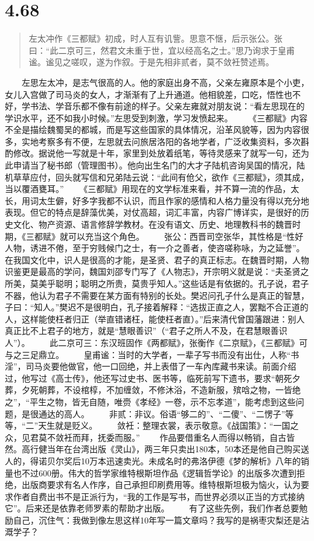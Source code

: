 \documentclass[]{book}
\begin{document}
\section{4.68}\label{section-245}

\begin{quote}
左太冲作《三都赋》初成，时人互有讥訾。思意不惬，后示张公。张曰：``此二京可三，然君文未重于世，宜以经高名之士。''思乃询求于皇甫谧。谧见之嗟叹，遂为作叙。于是先相非贰者，莫不敛衽赞述焉。
\end{quote}

　　左思左太冲，是志气很高的人。他的家庭出身不高，父亲左雍原本是个小吏，女儿入宫做了司马炎的女人，才渐渐有了上升通道。他相貌差，口吃，悟性也不好，学书法、学音乐都不像有前途的样子。父亲左雍就对朋友说：``看左思现在的学识水平，还不如我小时候。''左思受到刺激，学习发愤起来。
　　《三都赋》内容不全是描绘魏蜀吴的都城，而是写这些国家的具体情况，沿革风貌等，因为内容很多，实地考察多有不便，左思就去问旅居洛阳的各地学者，广泛收集资料，多次斟酌修改。据说他一写就是十年，家里到处放着纸笔，等待灵感来了就写一句，还为此申请当了秘书郎（管理图书）。他向出生名门的大才子陆机咨询吴国的情况，陆机草草应付，回头就写信和兄弟陆云说：``此间有伧父，欲作《三都赋》，须其成，当以覆酒甕耳。''
　　《三都赋》用现在的文学标准来看，并不算一流的作品，太长，用词太生僻，好多字我都不认识，而且作家的感情和人格力量没有得以充分地表现。但它的特点是辞藻优美，对仗高超，词汇丰富，内容广博详实，是很好的历史文化、物产资源、语言修辞学教材。在没有语文、历史、地理教科书的魏晋时期，《三都赋》就可以充当这个角色。
　　张公：西晋司空张华，其性格是``性好人物，诱进不倦，至于穷贱候门之士，有一介之善者，使咨嗟称咏，为之延誉''。在我国文化中，识人是很高的才能，是圣贤、君子的真正标志。在魏晋时期，人物识鉴更是最高的学问，魏国刘邵专门写了《人物志》，开宗明义就是说：``夫圣贤之所美，莫美乎聪明；聪明之所贵，莫贵乎知人。''这些话是有依据的。孔子说，君子不器，他认为君子不需要在某方面有特别的长处。樊迟问孔子什么是真正的智慧，子曰：``知人。''樊迟不是很明白，孔子接着解释：``选拔正直之人，罢黜不合正道的人，这样能使枉者归正（举直错诸枉，能使枉者直）。''后来清代曾国藩跟进：别人真正比不上君子的地方，就是``慧眼善识''（``君子之所人不及，在君慧眼善识人''）。
　　此二京可三：东汉班固作《两都赋》，张衡作《二京赋》，《三都赋》可与之三足鼎立。
　　皇甫谧：当时的大学者，一辈子写书而没有出仕，人称``书淫''，司马炎要他做官，他一口回绝，并上表借了一车內库藏书来读。前面介绍过，他写过《高士传》，他还写过史书、医书等，临死前写下遗书，要求``朝死夕葬，夕死朝葬，不设棺椁，不加缠敛，不修沐浴，不造新服，殡唅之物，一皆绝之''，``平生之物，皆无自随，唯赍《孝经》一卷，示不忘孝道''，能考虑到这些问题，是很通达的高人。
　　非贰：非议。俗语``够二的''、``二傻''、``二愣子''等等，``二''天生就是贬义。
　　敛衽：整理衣裳，表示敬意。《战国策》：``一国之众，见君莫不敛衽而拜，抚委而服。''
　　作品要借重名人而得以畅销，自古皆然。高行健当年在台湾出版《灵山》，两三年只卖出180本，50本还是他自己购买送人的，得诺贝尔奖后10万本迅速卖光。未成名时的弗洛伊德《梦的解析》八年的销量也不过600册。伟大的哲学家维特根斯坦作品《逻辑哲学论》的出版多次遭到拒绝，出版商要求有名人作序，自己承担印刷费用等。维特根斯坦极为恼火，认为要求作者自费出书不是正派行为，``我的工作是写书，而世界必须以正当的方式接纳它''。后来还是依靠老师罗素的帮助才出版。
　　有了这些先例，我们作者总要勉励自己，沉住气：我做到像左思这样10年写一篇文章吗？我写的是祸枣灾梨还是沾溉学子？
\end{document}
